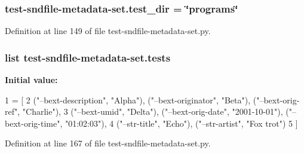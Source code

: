\subsubsection[{\texorpdfstring{test\+\_\+dir}{test_dir}}]{ {\bf test}-\/sndfile-\/metadata-\/set.\+test\+\_\+dir = \char`\"{}programs\char`\"{}}\hypertarget{namespacetest-sndfile-metadata-set_ab86c49508853fc70e1cb07500b8df69a}{}\label{namespacetest-sndfile-metadata-set_ab86c49508853fc70e1cb07500b8df69a}


Definition at line 149 of file test-\/sndfile-\/metadata-\/set.\+py.

\subsubsection[{\texorpdfstring{tests}{tests}}]{\setlength{\rightskip}{0pt plus 5cm}list {\bf test}-\/sndfile-\/metadata-\/set.\+tests}\hypertarget{namespacetest-sndfile-metadata-set_ab9f1387ea8f216c0c1dad3169d984274}{}\label{namespacetest-sndfile-metadata-set_ab9f1387ea8f216c0c1dad3169d984274}
{\bfseries Initial value\+:}
\begin{DoxyCode}
1 = [
2     (\textcolor{stringliteral}{"--bext-description"}, \textcolor{stringliteral}{"Alpha"}), (\textcolor{stringliteral}{"--bext-originator"}, \textcolor{stringliteral}{"Beta"}), (\textcolor{stringliteral}{"--bext-orig-ref"}, \textcolor{stringliteral}{"Charlie"}),
3     (\textcolor{stringliteral}{"--bext-umid"}, \textcolor{stringliteral}{"Delta"}), (\textcolor{stringliteral}{"--bext-orig-date"}, \textcolor{stringliteral}{"2001-10-01"}),  (\textcolor{stringliteral}{"--bext-orig-time"}, \textcolor{stringliteral}{"01:02:03"}),
4     (\textcolor{stringliteral}{"--str-title"}, \textcolor{stringliteral}{"Echo"}), (\textcolor{stringliteral}{"--str-artist"}, \textcolor{stringliteral}{"Fox trot"})
5     ]
\end{DoxyCode}


Definition at line 167 of file test-\/sndfile-\/metadata-\/set.\+py.

